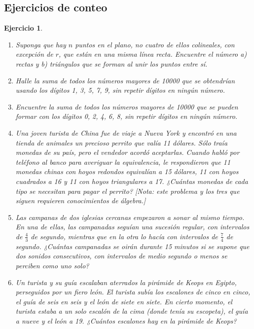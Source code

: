 \documentclass[12pt,twoside]{article}
\newtheorem{Ejer}{Ejercicio}
\begin{document}
\subsection{Ejercicios de conteo}

\begin{Ejer}
\begin{enumerate}

\item Suponga que hay $n$ puntos en el plano, no cuatro de ellos colineales, con excepción de $r$, que están en una misma línea recta. Encuentre el número a) rectas y b) triángulos que se forman al unir los puntos entre sí.

\item Halle la suma de todos los números mayores de 10000 que se obtendrían usando los dígitos 1, 3, 5, 7, 9, sin repetir dígitos en ningún número.

\item Encuentre la suma de todos los números mayores de 10000 que se pueden formar con los dígitos 0, 2, 4, 6, 8, sin repetir dígitos en ningún número.

\item Una joven turista de China fue de viaje a Nueva York y encontró en una tienda de animales un precioso perrito que valía 11 dólares. Sólo traía monedas de su país, pero el vendedor acordó aceptarlas. Cuando habló por teléfono al banco para averiguar la equivalencia, le respondieron que 11 monedas chinas con hoyos redondos equivalían a 15 dólares, 11 con hoyos cuadrados a 16 y 11 con hoyos triangulares a 17. ¿Cuántas monedas de cada tipo se necesitan para pagar el perrito? [Nota: este problema y los tres que siguen requieren conocimientos de álgebra.]

\item Las campanas de dos iglesias cercanas empezaron a sonar al mismo tiempo. En una de ellas, las campanadas seguían una sucesión regular, con intervalos de $\frac{4}{3}$ de segundo, mientras que en la otra lo hacía con intervalos de $\frac{7}{4}$ de segundo. ¿Cuántas campanadas se oirán durante 15 minutos si se supone que dos sonidos consecutivos, con intervalos de medio segundo o menos se perciben como uno solo?

\item Un turista y su guía escalaban aterrados la pirámide de Keops en Egipto, perseguidos por un fiero león. El turista subía los escalones de cinco en cinco, el guía de seis en seis y el león de siete en siete. En cierto momento, el turista estaba a un solo escalón de la cima (donde tenía su escopeta), el guía a nueve y el león a 19. ¿Cuántos escalones hay en la pirámide de Keops?


\end{enumerate}
\end{Ejer}
\end{document}
